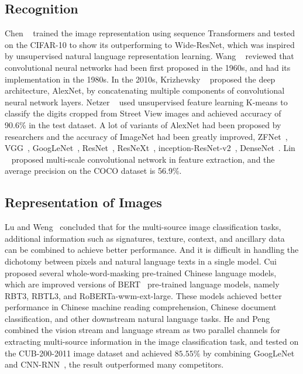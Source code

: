 \documentclass[review]{cvpr}
\begin{document}
\subsection{Recognition}

  Chen \etal~\cite{chen2020generative} trained the image representation using sequence Transformers and tested on the CIFAR-10 to show its outperforming to Wide-ResNet,
which was inspired by unsupervised natural language representation learning.
  Wang \etal~\cite{wang2019development} reviewed that convolutional neural networks had been first proposed in the 1960s, and had its implementation in the 1980s.
  In the 2010s, Krizhevsky \etal~\cite{krizhevsky2012imagenet} proposed the deep architecture, AlexNet, by concatenating multiple components of convolutional neural network layers.
  Netzer \etal~\cite{netzer2011reading} used unsupervised feature learning K-means to classify the digits cropped from Street View images and achieved accuracy of 90.6\% in the test dataset.
  A lot of variants of AlexNet had been proposed by researchers and the accuracy of ImageNet had been greatly improved, \eg ZFNet~\cite{zeiler2014visualizing}, VGG~\cite{simonyan2014very}, GoogLeNet~\cite{szegedy2015going}, ResNet~\cite{he2016deep},
  ResNeXt~\cite{xie2017aggregated}, inception-ResNet-v2~\cite{szegedy2016inception}, DenseNet~\cite{huang2016deep}.
  Lin \etal~\cite{lin2017feature} proposed multi-scale convolutional network in feature extraction, and the average precision on the COCO dataset is 56.9\%.

\subsection{Representation of Images}

  Lu and Weng~\cite{lu2007survey} concluded that for the multi-source image classification tasks, additional information such as signatures, texture, context, and ancillary data can be combined to achieve better performance.
And it is difficult in handling the dichotomy between pixels and natural language texts in a single model.
  Cui \etal~\cite{cui2020revisiting} proposed several whole-word-masking pre-trained Chinese language models,
which are improved versions of BERT~\cite{devlin2019bert} pre-trained language models, namely RBT3, RBTL3, and RoBERTa-wwm-ext-large.
These models achieved better performance in Chinese machine reading comprehension, Chinese document classification, and other downstream natural language tasks.
  He and Peng~\cite{he2017fine} combined the vision stream and language stream as two parallel channels for extracting multi-source information in the image classification task,
and tested on the CUB-200-2011 image dataset and achieved $85.55\%$ by combining GoogLeNet~\cite{szegedy2015going} and CNN-RNN~\cite{reed2016learning}, the result outperformed many competitors.
\end{document}
